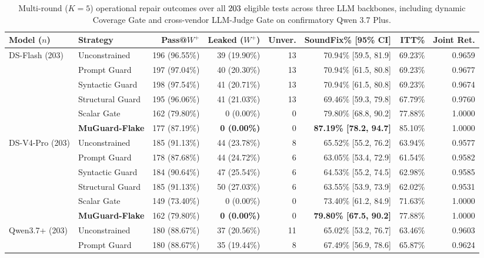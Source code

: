 \begin{table}[t]
\centering
\scriptsize
\setlength{\tabcolsep}{2.7pt}
\caption{Multi-round ($K=5$) operational repair outcomes over all $203$ eligible tests across three LLM backbones, including dynamic Coverage Gate and cross-vendor LLM-Judge Gate on confirmatory Qwen 3.7 Plus.}
\label{tab:k5_operational}
\begin{tabular}{llrrrrrr}
\toprule
Model ($n$) & Strategy & Pass@$W^+$ & Leaked ($W^+$) & Unver. & SoundFix\% [95\% CI] & ITT\% & Joint Ret. \\
\midrule
DS-Flash (203) & Unconstrained & 196 (96.55\%) & 39 (19.90\%) & 13 & 70.94\% [59.5, 81.9] & 69.23\% & 0.9659 \\
 & Prompt Guard & 197 (97.04\%) & 40 (20.30\%) & 13 & 70.94\% [61.5, 80.8] & 69.23\% & 0.9677 \\
 & Syntactic Guard & 198 (97.54\%) & 41 (20.71\%) & 13 & 70.94\% [61.5, 80.8] & 69.23\% & 0.9674 \\
 & Structural Guard & 195 (96.06\%) & 41 (21.03\%) & 13 & 69.46\% [59.3, 79.8] & 67.79\% & 0.9760 \\
 & Scalar Gate & 162 (79.80\%) & 0 (0.00\%) & 0 & 79.80\% [68.8, 90.2] & 77.88\% & 1.0000 \\
 & \textbf{MuGuard-Flake} & 177 (87.19\%) & \textbf{0 (0.00\%)} & 0 & \textbf{87.19\% [78.2, 94.7]} & 85.10\% & 1.0000 \\
\midrule
DS-V4-Pro (203) & Unconstrained & 185 (91.13\%) & 44 (23.78\%) & 8 & 65.52\% [55.2, 76.2] & 63.94\% & 0.9577 \\
 & Prompt Guard & 178 (87.68\%) & 44 (24.72\%) & 6 & 63.05\% [53.4, 72.9] & 61.54\% & 0.9582 \\
 & Syntactic Guard & 184 (90.64\%) & 47 (25.54\%) & 6 & 64.53\% [55.2, 74.5] & 62.98\% & 0.9585 \\
 & Structural Guard & 185 (91.13\%) & 50 (27.03\%) & 6 & 63.55\% [53.9, 73.9] & 62.02\% & 0.9531 \\
 & Scalar Gate & 149 (73.40\%) & 0 (0.00\%) & 0 & 73.40\% [61.2, 84.9] & 71.63\% & 1.0000 \\
 & \textbf{MuGuard-Flake} & 162 (79.80\%) & \textbf{0 (0.00\%)} & 0 & \textbf{79.80\% [67.5, 90.2]} & 77.88\% & 1.0000 \\
\midrule
Qwen3.7+ (203) & Unconstrained & 180 (88.67\%) & 37 (20.56\%) & 11 & 65.02\% [53.2, 76.7] & 63.46\% & 0.9603 \\
 & Prompt Guard & 180 (88.67\%) & 35 (19.44\%) & 8 & 67.49\% [56.9, 78.6] & 65.87\% & 0.9624 \\

\end{tabular}
\end{table}
